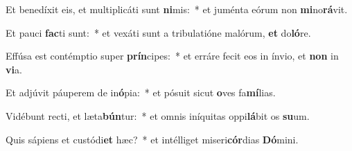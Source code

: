 \item Et benedíxit eis, et multiplicáti sunt \textbf{ni}mis:~* et juménta eórum non \textbf{mi}no\textbf{rá}vit.
\item Et pauci \textbf{fac}ti sunt:~* et vexáti sunt a tribulatióne malórum, \textbf{et} do\textbf{ló}re.
\item Effúsa est contémptio super \textbf{prín}cipes:~* et erráre fecit eos in ínvio, et \textbf{non} in \textbf{vi}a.
\item Et adjúvit páuperem de in\textbf{ó}pia:~* et pósuit sicut \textbf{o}ves fa\textbf{mí}lias.
\item Vidébunt recti, et læta\textbf{bún}tur:~* et omnis iníquitas oppi\textbf{lá}bit os \textbf{su}um.
\item Quis sápiens et custódi\textbf{et} hæc?~* et intélliget miseri\textbf{cór}dias \textbf{Dó}mini.
